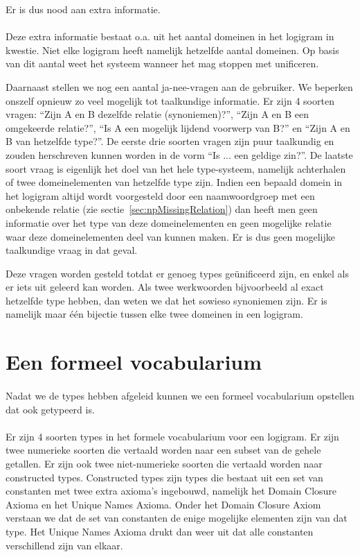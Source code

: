 Er is dus nood aan extra informatie.

\paragraph{} Deze extra informatie bestaat o.a. uit het aantal domeinen in het logigram in kwestie. Niet elke logigram heeft namelijk hetzelfde aantal domeinen. Op basis van dit aantal weet het systeem wanneer het mag stoppen met unificeren.

Daarnaast stellen we nog een aantal ja-nee-vragen aan de gebruiker. We beperken onszelf opnieuw zo veel mogelijk tot taalkundige informatie. Er zijn 4 soorten vragen: ``Zijn A en B dezelfde relatie (synoniemen)?'', ``Zijn A en B een omgekeerde relatie?'', ``Is A een mogelijk lijdend voorwerp van B?'' en ``Zijn A en B van hetzelfde type?''. De eerste drie soorten vragen zijn puur taalkundig en zouden herschreven kunnen worden in de vorm ``Is ... een geldige zin?''. De laatste soort vraag is eigenlijk het doel van het hele type-systeem, namelijk achterhalen of twee domeinelementen van hetzelfde type zijn. Indien een bepaald domein in het logigram altijd wordt voorgesteld door een naamwoordgroep met een onbekende relatie (zie sectie~\ref{sec:npMissingRelation}) dan heeft men geen informatie over het type van deze domeinelementen en geen mogelijke relatie waar deze domeinelementen deel van kunnen maken. Er is dus geen mogelijke taalkundige vraag in dat geval.

Deze vragen worden gesteld totdat er genoeg types geünificeerd zijn, en enkel als er iets uit geleerd kan worden. Als twee werkwoorden bijvoorbeeld al exact hetzelfde type hebben, dan weten we dat het sowieso synoniemen zijn. Er is namelijk maar één bijectie tussen elke twee domeinen in een logigram.

\section{Een formeel vocabularium}
\paragraph{} Nadat we de types hebben afgeleid kunnen we een formeel vocabularium opstellen dat ook getypeerd is.

\paragraph{}Er zijn 4 soorten types in het formele vocabularium voor een logigram. Er zijn twee numerieke soorten die vertaald worden naar een subset van de gehele getallen. Er zijn ook twee niet-numerieke soorten die vertaald worden naar constructed types. Constructed types zijn types die bestaat uit een set van constanten met twee extra axioma's ingebouwd, namelijk het Domain Closure Axioma en het Unique Names Axioma. Onder het Domain Closure Axiom verstaan we dat de set van constanten de enige mogelijke elementen zijn van dat type. Het Unique Names Axioma drukt dan weer uit dat alle constanten verschillend zijn van elkaar.

